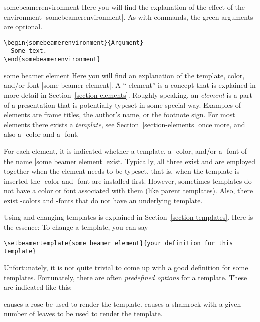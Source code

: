 \begin{environment}{{somebeamerenvironment}}
  Here you will find the explanation of the effect of the environment |somebeamerenvironment|. As with commands, the green arguments are optional.

  \example
\begin{verbatim}
\begin{somebeamerenvironment}{Argument}
  Some text.
\end{somebeamerenvironment}
\end{verbatim}
\end{environment}

\begin{element}{some beamer element}\yes\yes\yes
  Here you will find an explanation of the template, color, and/or font |some beamer element|. A ``\beamer-element'' is a concept that is explained in more detail in Section~\ref{section-elements}. Roughly speaking, an \emph{element} is a part of a presentation that is potentially typeset in some special way. Examples of elements are frame titles, the author's name, or the footnote sign. For most elements there exists a \emph{template}, see Section~\ref{section-elements} once more, and also a \beamer-color and a \beamer-font.

  For each element, it is indicated whether a template, a \beamer-color, and/or a \beamer-font of the name |some beamer element| exist. Typically, all three exist and are employed together when the element needs to be typeset, that is, when the template is inserted the \beamer-color and -font are installed first. However, sometimes templates do not have a color or font associated with them (like parent templates). Also, there exist \beamer-colors and -fonts that do not have an underlying template.

  Using and changing templates is explained in Section~\ref{section-templates}. Here is the essence: To change a template, you can say
\begin{verbatim}
\setbeamertemplate{some beamer element}{your definition for this template}
\end{verbatim}

  Unfortunately, it is not quite trivial to come up with a good definition for some templates. Fortunately, there are often \emph{predefined options} for a template. These are indicated like this:
  \begin{itemize}
    causes a rose be used to render the template.
    causes a shamrock with a given number of leaves to be used to render the template.
  \end{itemize}


\end{element}
